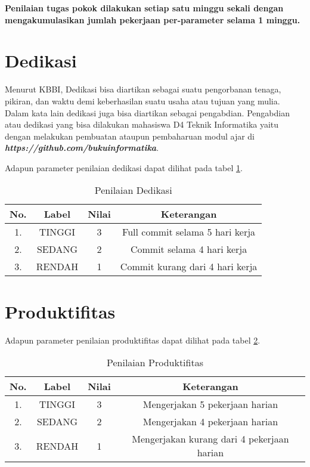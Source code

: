 \textbf{Penilaian tugas pokok dilakukan setiap satu minggu sekali dengan mengakumulasikan jumlah pekerjaan per-parameter selama 1 minggu.}

\section{Dedikasi}

Menurut KBBI, Dedikasi bisa diartikan sebagai suatu pengorbanan tenaga, pikiran, dan waktu demi keberhasilan suatu usaha atau tujuan yang mulia. Dalam kata lain dedikasi juga bisa diartikan sebagai pengabdian. Pengabdian atau dedikasi yang bisa dilakukan mahasiswa D4 Teknik Informatika yaitu dengan melakukan pembuatan ataupun pembaharuan modul ajar di \textbf{\textit{https://github.com/bukuinformatika}}.

Adapun parameter penilaian dedikasi dapat dilihat pada tabel \ref{tab:nilaidedikasi}.

\begin{table}[h]
\caption{Penilaian Dedikasi}
\centering
\begin{tabular}{|c|c|c|c|}
\hline
\textbf{No.}&\textbf{Label}&\textbf{Nilai}&\textbf{Keterangan}\\
\hline
1.&TINGGI&3&Full commit selama 5 hari kerja\\
\hline
2.&SEDANG&2&Commit selama 4 hari kerja\\
\hline
3.&RENDAH&1&Commit kurang dari 4 hari kerja\\
\hline
\end{tabular}
\label{tab:nilaidedikasi}
\end{table}

\section{Produktifitas}

Adapun parameter penilaian produktifitas dapat dilihat pada tabel \ref{tab:nilaiproduktifitas}.

\begin{table}[h]
\caption{Penilaian Produktifitas}
\centering
\begin{tabular}{|c|c|c|c|}
\hline
\textbf{No.}&\textbf{Label}&\textbf{Nilai}&\textbf{Keterangan}\\
\hline
1.&TINGGI&3&Mengerjakan 5 pekerjaan harian\\
\hline
2.&SEDANG&2&Mengerjakan 4 pekerjaan harian\\
\hline
3.&RENDAH&1&Mengerjakan kurang dari 4 pekerjaan harian\\
\hline
\end{tabular}
\label{tab:nilaiproduktifitas}
\end{table}

